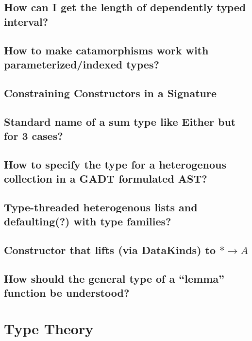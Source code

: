\documentclass{book}%
\begin{document}
\section{How can I get the length of dependently typed interval?}


\section{How to make catamorphisms work with parameterized/indexed types?}


\section{Constraining Constructors in a Signature}


\section{Standard name of a sum type like Either but for 3 cases?}


\section{How to specify the type for a heterogenous collection in a GADT formulated AST?}


\section{Type-threaded heterogenous lists and defaulting(?) with type families?}


\section{Constructor that lifts (via DataKinds) to $\ast\to A$}


\section{How should the general type of a ``lemma'' function be understood?}



\chapter{Type Theory}
\end{document}
